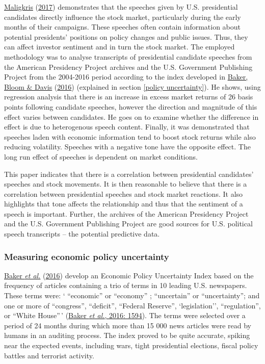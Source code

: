 \documentclass[11pt,preprint, authoryear]{elsarticle}
\numberwithin{equation}{section}
\numberwithin{figure}{section}
\numberwithin{table}{section}
\begin{document}
\protect\hyperlink{ref-maligkris2017political}{Maligkris}
(\protect\hyperlink{ref-maligkris2017political}{2017}) demonstrates that
the speeches given by U.S. presidential candidates directly influence
the stock market, particularly during the early months of their
campaigns. These speeches often contain information about potential
presidents' positions on policy changes and public issues. Thus, they
can affect investor sentiment and in turn the stock market. The employed
methodology was to analyse transcripts of presidential candidate
speeches from the American Presidency Project archives and the U.S.
Government Publishing Project from the 2004-2016 period according to the
index developed in \protect\hyperlink{ref-baker2016measuring}{Baker,
Bloom \& Davis} (\protect\hyperlink{ref-baker2016measuring}{2016})
(explained in section \ref{policy uncertainty}). He shows, using
regression analysis that there is an increase in excess market returns
of 26 basis points following candidate speeches, however the direction
and magnitude of this effect varies between candidates. He goes on to
examine whether the difference in effect is due to heterogenous speech
content. Finally, it was demonstrated that speeches laden with economic
information tend to boost stock returns while also reducing volatility.
Speeches with a negative tone have the opposite effect. The long run
effect of speeches is dependent on market conditions.

This paper indicates that there is a correlation between presidential
candidates' speeches and stock movements. It is then reasonable to
believe that there is a correlation between presidential speeches and
stock market reactions. It also highlights that tone affects the
relationship and thus that the sentiment of a speech is important.
Further, the archives of the American Presidency Project and the U.S.
Government Publishing Project are good sources for U.S. political speech
transcripts -- the potential predictive data.

\hypertarget{measuring-economic-policy-uncertainty}{%
\subsubsection{\texorpdfstring{Measuring economic policy uncertainty
\label{policy uncertainty}}{Measuring economic policy uncertainty }}\label{measuring-economic-policy-uncertainty}}

\protect\hyperlink{ref-baker2016measuring}{Baker \emph{et al.}}
(\protect\hyperlink{ref-baker2016measuring}{2016}) develop an Economic
Policy Uncertainty Index based on the frequency of articles containing a
trio of terms in 10 leading U.S. newspapers. These terms were: `
``economic'' or ``economy'' ; ``uncertain'' or ``uncertainty''; and one
or more of ``congress'', ``deficit'', ``Federal Reserve'',
`legislation'', ``regulation'', or ``White House''\,'
(\protect\hyperlink{ref-baker2016measuring}{Baker \emph{et al.}, 2016:
1594}). The terms were selected over a period of 24 months during which
more than 15 000 news articles were read by humans in an auditing
process. The index proved to be quite accurate, spiking near the
expected events, including wars, tight presidential elections, fiscal
policy battles and terrorist activity.
\end{document}
